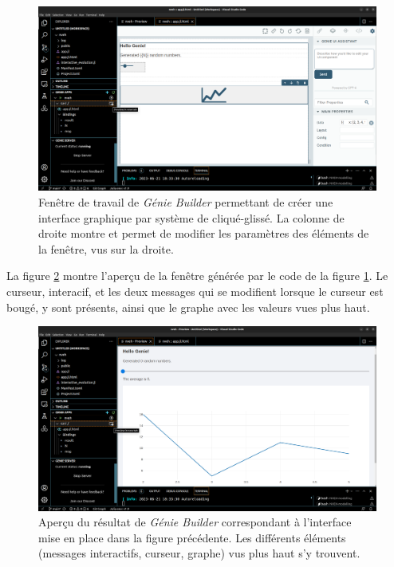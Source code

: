 \documentclass[a4paper, french, 12pt, titlepage]{article}
\begin{document}
\begin{figure}[H]
  \includegraphics[width=\linewidth]{geniebuilder_travail.png}
  \caption{Fenêtre de travail de \emph{Génie Builder} permettant de créer une interface graphique par système de cliqué-glissé. La colonne de droite montre et permet de modifier les paramètres des éléments de la fenêtre, vus sur la droite.}
  \label{fig:fig6}
\end{figure}

La figure \ref{fig:fig7} montre l'aperçu de la fenêtre générée par le code de la figure \ref{fig:fig6}.
Le curseur, interacif, et les deux messages qui se modifient lorsque le curseur est bougé, y sont présents, ainsi que le graphe avec les valeurs vues plus haut. 

\begin{figure}[H]
  \includegraphics[width=\linewidth]{geniebuilder_result.png}
  \caption{Aperçu du résultat de \emph{Génie Builder} correspondant à l'interface mise en place dans la figure précédente. Les différents éléments (messages interactifs, curseur, graphe) vus plus haut s'y trouvent.}
  \label{fig:fig7}
\end{figure}
\end{document}

